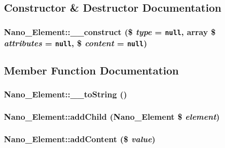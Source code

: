 \subsection{Constructor \& Destructor Documentation}
\hypertarget{classNano__Element_f49062d718c493501fca741e0f6bd341}{
\subsubsection[{\_\-\_\-construct}]{\setlength{\rightskip}{0pt plus 5cm}Nano\_\-Element::\_\-\_\-construct (\$ {\em type} = {\tt null}, \/  array \$ {\em attributes} = {\tt null}, \/  \$ {\em content} = {\tt null})}}
\label{classNano__Element_f49062d718c493501fca741e0f6bd341}




\subsection{Member Function Documentation}
\hypertarget{classNano__Element_8981fda3d44381f41e2d2592f3676cb0}{
\subsubsection[{\_\-\_\-toString}]{\setlength{\rightskip}{0pt plus 5cm}Nano\_\-Element::\_\-\_\-toString ()}}
\label{classNano__Element_8981fda3d44381f41e2d2592f3676cb0}


\hypertarget{classNano__Element_1b73a03b9a500111184ece0c86f0724e}{
\subsubsection[{addChild}]{\setlength{\rightskip}{0pt plus 5cm}Nano\_\-Element::addChild ({\bf Nano\_\-Element} \$ {\em element})}}
\label{classNano__Element_1b73a03b9a500111184ece0c86f0724e}


\hypertarget{classNano__Element_b0692ee2c5043aace23f6840a9aa4c01}{
\subsubsection[{addContent}]{\setlength{\rightskip}{0pt plus 5cm}Nano\_\-Element::addContent (\$ {\em value})}}
\label{classNano__Element_b0692ee2c5043aace23f6840a9aa4c01}


